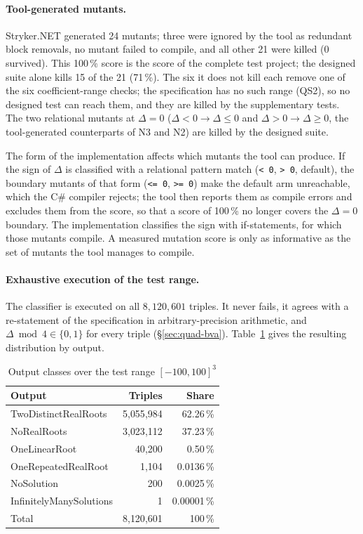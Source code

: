 \documentclass[11pt,a4paper]{article}
\begin{document}
\paragraph{Tool-generated mutants.} Stryker.NET generated 24 mutants; three
were ignored by the tool as redundant block removals, no mutant failed to
compile, and all other 21 were killed (0 survived). This 100\,\% score is the
score of the complete test project; the designed suite alone kills 15 of the
21 (71\,\%). The six it does not kill each remove one of the six
coefficient-range checks; the specification has no such range (QS2), so no
designed test can reach them, and they are killed by the supplementary
tests. The two relational mutants at \(\Delta=0\) (\(\Delta<0\to\Delta\le0\)
and \(\Delta>0\to\Delta\ge0\), the tool-generated counterparts of N3 and N2)
are killed by the designed suite.

The form of the implementation affects which mutants the tool can produce.
If the sign of \(\Delta\) is classified with a relational pattern match
(\texttt{< 0}, \texttt{> 0}, default), the boundary mutants of that form
(\texttt{<= 0}, \texttt{>= 0}) make the default arm unreachable, which the
C\# compiler rejects; the tool then reports them as compile errors and
excludes them from the score, so that a score of 100\,\% no longer covers
the \(\Delta=0\) boundary. The implementation classifies the sign with
if-statements, for which those mutants compile. A measured mutation score is
only as informative as the set of mutants the tool manages to compile.

\paragraph{Exhaustive execution of the test range.} The classifier is
executed on all \(8{,}120{,}601\) triples. It never fails, it agrees with a
re-statement of the specification in arbitrary-precision arithmetic, and
\(\Delta\bmod 4\in\{0,1\}\) for every triple (\S\ref{sec:quad-bva}).
Table~\ref{tab:emp-classes} gives the resulting distribution by output.

\begin{table}[H]
\centering
\caption{Output classes over the test range \([-100,100]^3\)}
\label{tab:emp-classes}
\small
\begin{tabular}{l r r}
\toprule
Output & Triples & Share \\
\midrule
TwoDistinctRealRoots & 5{,}055{,}984 & 62.26\,\% \\
NoRealRoots & 3{,}023{,}112 & 37.23\,\% \\
OneLinearRoot & 40{,}200 & 0.50\,\% \\
OneRepeatedRealRoot & 1{,}104 & 0.0136\,\% \\
NoSolution & 200 & 0.0025\,\% \\
InfinitelyManySolutions & 1 & 0.00001\,\% \\
\midrule
Total & 8{,}120{,}601 & 100\,\% \\
\bottomrule
\end{tabular}
\end{table}
\end{document}

